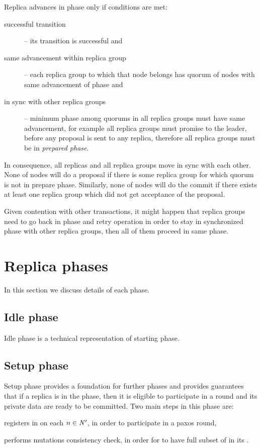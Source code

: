 Replica advances in phase only if conditions are met: \begin{description}
\item[successful transition] -- its transition is successful and
\item[same advancement within replica group] -- each replica group to which that node belongs has quorum of nodes with same advancement of phase and
\item[in sync with other replica groups] -- minimum phase among quorums in all replica groups must have same advancement, for example all replica groups must promise to the leader, before any proposal is sent to any replica, therefore all replica groups must be in \emph{prepared phase}.
\end{description}


In consequence, all replicas and all replica groups move in sync with each other. None of nodes will do a proposal if there is some replica group for which quorum is not in prepare phase. 
Similarly, none of nodes will do the commit if there exists at least one replica group which did not get acceptance of the proposal.  

Given contention with other transactions, it might happen that replica groups need to go back in phase and retry operation in order to stay in synchronized phase with other replica groups, then all of them proceed in same phase.

\section{Replica phases}
In this section we discuss details of each phase.

\subsection{Idle phase}
Idle phase is a technical representation of starting phase.

\subsection{Setup phase}
Setup phase provides a foundation for further phases and provides guarantees that if a replica is in the phase, then it is eligible to participate in a \paxos round and its private data are ready to be committed. Two main steps in this phase are: \begin{enumerate*}
\item \transaction registers in \txIndex on each $n\in \text{$\mathit{N'}$}$, in order to participate in a paxos round,
\item \transaction performs mutations consistency check, in order for  to have full subset of \mutations in its \txStorage.
\end{enumerate*}


